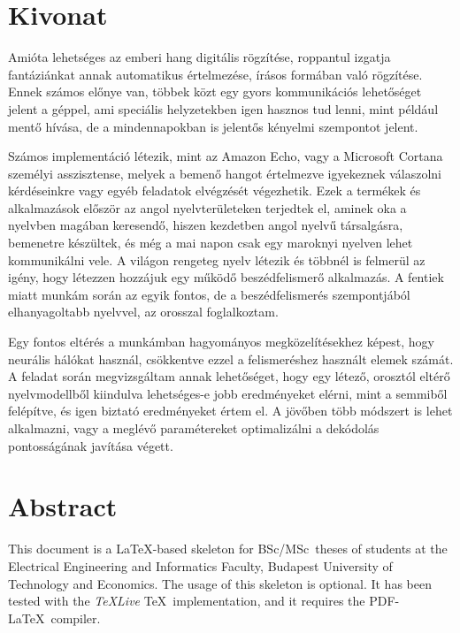 \setcounter{page}{1}

\selecthungarian

\chapter*{Kivonat}

Amióta lehetséges az emberi hang digitális rögzítése, roppantul izgatja fantáziánkat annak automatikus értelmezése, írásos formában való rögzítése. Ennek számos előnye van, többek közt egy gyors kommunikációs lehetőséget jelent a géppel, ami speciális helyzetekben igen hasznos tud lenni, mint például mentő hívása, de a mindennapokban is jelentős kényelmi szempontot jelent.

Számos implementáció létezik, mint az Amazon Echo, vagy a Microsoft Cortana személyi asszisztense, melyek a bemenő hangot értelmezve igyekeznek válaszolni kérdéseinkre vagy egyéb feladatok elvégzését végezhetik. Ezek a termékek és alkalmazások először az angol nyelvterületeken terjedtek el, aminek oka a nyelvben magában keresendő, hiszen kezdetben angol nyelvű társalgásra, bemenetre készültek, és még a mai napon csak egy maroknyi nyelven lehet kommunikálni vele. A világon rengeteg nyelv létezik és többnél is felmerül az igény, hogy létezzen hozzájuk egy működő beszédfelismerő alkalmazás. A fentiek miatt munkám során az egyik fontos, de a beszédfelismerés szempontjából elhanyagoltabb nyelvvel, az orosszal foglalkoztam. 

Egy fontos eltérés a munkámban hagyományos megközelítésekhez képest, hogy neurális hálókat használ, csökkentve ezzel a felismeréshez használt elemek számát. A feladat során megvizsgáltam annak lehetőséget, hogy egy létező, orosztól eltérő nyelvmodellből kiindulva lehetséges-e jobb eredményeket elérni, mint a semmiből felépítve, és igen biztató eredményeket értem el. A jövőben több módszert is lehet alkalmazni, vagy a meglévő paramétereket optimalizálni a dekódolás pontosságának javítása végett.

\vfill
\selectenglish


\chapter*{Abstract}

This document is a \LaTeX-based skeleton for BSc/MSc~theses of students at the Electrical Engineering and Informatics Faculty, Budapest University of Technology and Economics. The usage of this skeleton is optional. It has been tested with the \emph{TeXLive} \TeX~implementation, and it requires the PDF-\LaTeX~compiler.


\vfill
\selectthesislanguage

\setcounter{romanPage}{\value{page}}
